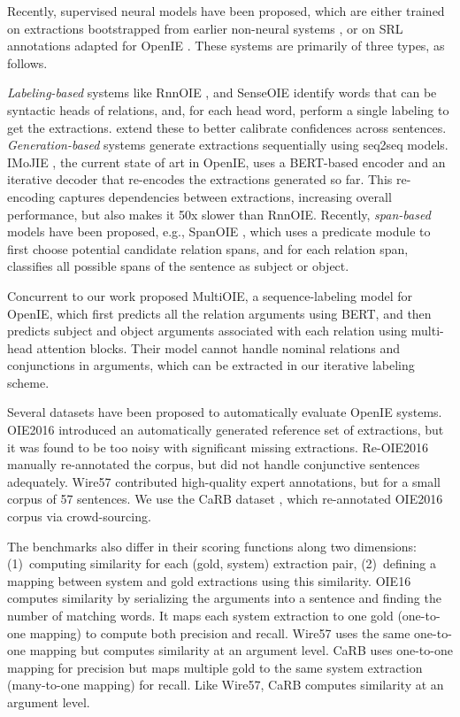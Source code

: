 \documentclass[11pt,a4paper]{article}
\begin{document}
Recently, supervised neural models have been proposed, which are either trained on extractions bootstrapped from earlier non-neural systems \cite{cui+18}, or on SRL annotations adapted for OpenIE \cite{Stanovsky2016EMNLP}. These systems are primarily of three types, as follows.

\textit{Labeling-based} systems like RnnOIE \cite{stanovsky&al18}, and SenseOIE \cite{roy&al19} identify words that can be syntactic heads of relations, and, for each head word, perform a single labeling to get the extractions.
\citet{jiang&al19} extend these to better calibrate confidences across sentences.
\textit{Generation-based} systems \cite{cui+18,sun2018logician} generate extractions sequentially using seq2seq models. IMoJIE \cite{kolluru&al20}, the current state of art in OpenIE, uses a BERT-based encoder and an iterative decoder that re-encodes the extractions generated so far. This re-encoding captures dependencies between extractions, increasing overall performance, but also makes it 50x slower than RnnOIE.
Recently, \textit{span-based} models \cite{jiang&al19} have been proposed, e.g., SpanOIE \cite{zhan&al19}, which uses a predicate module to first choose potential candidate relation spans, and for each relation span, classifies all possible spans of the sentence as subject or object.

Concurrent to our work \cite{ro&al20} proposed MultiOIE, a sequence-labeling model for OpenIE, which first predicts all the relation arguments using BERT, and then predicts subject and object arguments associated with each relation using multi-head attention blocks. Their model cannot handle nominal relations and conjunctions in arguments, which can be extracted in our iterative labeling scheme.




\vspace*{0.5ex}
 Several datasets have been proposed to automatically evaluate OpenIE systems.
OIE2016 \cite{Stanovsky2016EMNLP} introduced an automatically generated reference set of extractions, but it was found to be too noisy with significant missing extractions. Re-OIE2016 \cite{zhan&al19} manually re-annotated the corpus, but did not handle conjunctive sentences adequately. Wire57 \cite{william&al18} contributed high-quality expert annotations, but for a small corpus of 57 sentences. We use the CaRB dataset \cite{bhardwaj&al19}, which re-annotated OIE2016 corpus via crowd-sourcing. 

The benchmarks also differ in their scoring functions along two dimensions: (1)~computing similarity for each (gold, system) extraction pair, (2)~defining a mapping between system and gold extractions using this similarity. OIE16 computes similarity by serializing the arguments into a sentence and finding the number of matching words. It maps each system extraction to one gold (one-to-one mapping) to compute both precision and recall. Wire57 uses the same one-to-one mapping but computes similarity at an argument level. CaRB uses one-to-one mapping for precision but maps multiple gold to the same system extraction (many-to-one mapping) for recall. Like Wire57, CaRB computes similarity at an argument level.
\end{document}
